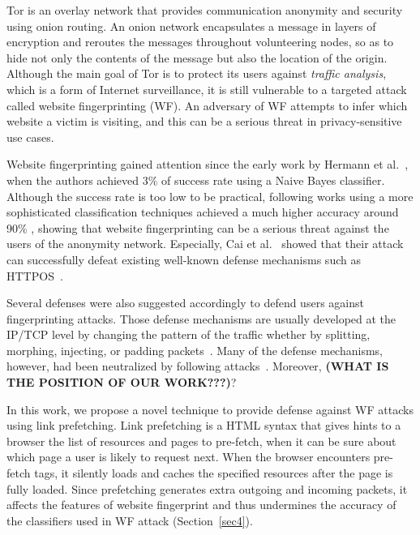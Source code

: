 
Tor is an overlay network that provides communication anonymity and security using onion routing.
An onion network encapsulates a message in layers of encryption and reroutes the messages throughout volunteering nodes, so as to hide not only the contents of the message but also the location of the origin.
Although the main goal of Tor is to protect its users against {\it traffic analysis}, which is a form of Internet surveillance, it is still vulnerable to a targeted attack called website fingerprinting (WF).
An adversary of WF attempts to infer which website a victim is visiting, and this can be a serious threat in privacy-sensitive use cases.

Website fingerprinting gained attention since the early work by Hermann et al.~\cite{hermann}, when the authors achieved 3\% of success rate using a Naive Bayes classifier.
Although the success rate is too low to be practical, following works using a more sophisticated classification techniques achieved a much higher accuracy around 90\% \cite{panchenko11, wang2013improved, cai2012touching}, showing that website fingerprinting can be a serious threat against the users of the anonymity network.
Especially, Cai et al.~\cite{cai2012touching} showed that their attack can successfully defeat existing well-known defense mechanisms such as HTTPOS~\cite{luo2011}.

Several defenses were also suggested accordingly to defend users against fingerprinting attacks.
Those defense mechanisms are usually developed at the IP/TCP level by changing the pattern of the traffic whether by splitting, morphing, injecting, or padding packets~\cite{fu2003, wright2009, luo2011, perry11}.
Many of the defense mechanisms, however, had been neutralized by following attacks~\cite{cai2012touching}.
Moreover, {\bf (WHAT IS THE POSITION OF OUR WORK???)}?

In this work, we propose a novel technique to provide defense against WF attacks using link prefetching.
Link prefetching is a HTML syntax that gives hints to a browser the list of resources and pages to pre-fetch, when it can be sure about which page a user is likely to request next.
When the browser encounters pre-fetch tags, it silently loads and caches the specified resources after the page is fully loaded.
Since prefetching generates extra outgoing and incoming packets, it affects the features of website fingerprint and thus undermines the accuracy of the classifiers used in WF attack (Section~\ref{sec4}).

